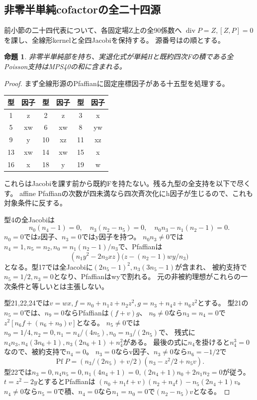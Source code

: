 \documentclass[a4paper,11pt]{ltjsarticle}
\newtheorem{proposition}{命題}[section]
\theoremstyle{definition}
\begin{document}
\subsection{非零半単純cofactorの全二十四源}
前小節の二十四代表について、各固定場Z上の全90係数へ
$\operatorname{div}P=Z,[Z,P]=0$を課し、全線形kernelと全四Jacobiを保持する。
源番号はの順とする。
\begin{proposition}\label{prop:quartic-semisimple-all}
非零半単純部を持ち、実退化式が単純Hと既約四次Fの積である全Poisson支持はMPS40の和に含まれる。
\end{proposition}
\begin{proof}
まず全線形源のPfaffianに固定座標因子がある十五型を処理する。
\begin{center}\small
\begin{tabular}{c|c@{\qquad}c|c@{\qquad}c|c}
型&因子&型&因子&型&因子\\\hline
1&z&2&z&3&x\\
5&xw&6&xw&8&yw\\
9&y&10&xz&11&xz\\
13&xw&14&xw&15&x\\
16&x&18&y&19&w
\end{tabular}
\end{center}
これらはJacobiを課す前から既約Fを持たない。残る九型の全支持を以下で尽くす。
affine Pfaffianの次数が四未満なら四次斉次化にh因子が生じるので、これも対象条件に反する。

型4の全Jacobiは
\[
 n_0(n_4-1)=0,\quad n_3(n_2-n_5)=0,\quad n_0n_3-n_1(n_2-1)=0.
\]
$n_0=0$ではz因子、$n_3=0$ではy因子を持つ。
$n_0n_3\ne0$では$n_4=1,n_5=n_2,n_0=n_1(n_2-1)/n_3$で、Pfaffianは
\[
 (n_1y^2-2n_3xz)\bigl(z-(n_2-1)wy/n_3\bigr)
\]
となる。型17では全Jacobiに$(2n_5-1)^2,n_3(3n_5-1)$が含まれ、
被約支持で$n_5=1/2,n_3=0$となり、Pfaffianはwyで割れる。
元の非被約理想がこれらの一次条件と等しいとは主張しない。

型21,22,24では$v=wx,f=n_0+n_1z+n_2z^2,g=n_3+n_4z+n_6z^2$とする。
型21の$n_5=0$では、$n_9=0$ならPfaffianは$(f+v)g$、
$n_9\ne0$なら$n_3=n_4=0$で$z^2[n_6f+(n_6+n_9)v]$となる。
$n_5\ne0$では$n_9=1/4,n_2=0,n_1=n_4/(4n_5),n_0=n_3/(2n_5)$で、
残式に$n_4n_3,n_4(3n_6+1),n_3(2n_6+1)+n_4^2$がある。
最後の式に$n_4$を掛けると$n_4^3=0$なので、被約支持で$n_4=0$。
$n_3=0$ならv因子、$n_3\ne0$なら$n_6=-1/2$で
\[
 \operatorname{Pf}P=(n_3/(2n_5)+v/2)(n_3-z^2/2+n_5v).
\]
型22では$n_3=0,n_4n_5=0,n_1(4n_4+1)=0,
(2n_4+1)n_0+2n_1n_2=0$が従う。
$t=z^2-2y$とするとPfaffianは
$(n_0+n_1t+v)(n_2+n_4t)-n_5(2n_4+1)v$。
$n_4\ne0$なら$n_5=0$で積、$n_4=0$なら$n_1=n_0=0$で$(n_2-n_5)v$となる。


\end{proof}
\end{document}
